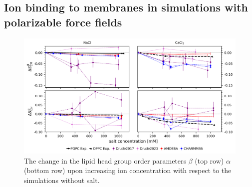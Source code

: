 \documentclass[journal=jacsat,manuscript=article,layout=singlecolumn]{achemso}
\begin{document}
\clearpage

\subsection{Ion binding to membranes in simulations with polarizable force fields}


\begin{figure}[!hbt]
	\centering
	\includegraphics{Figures/order_parameter_change.png}
	\caption{The change in the lipid head group order parameters $\beta$ (top row) $\alpha$ (bottom row) upon increasing ion concentration with respect to the simulations without salt. }
	\label{fig:popc_order_parameter_change}
\end{figure}
\end{document}
